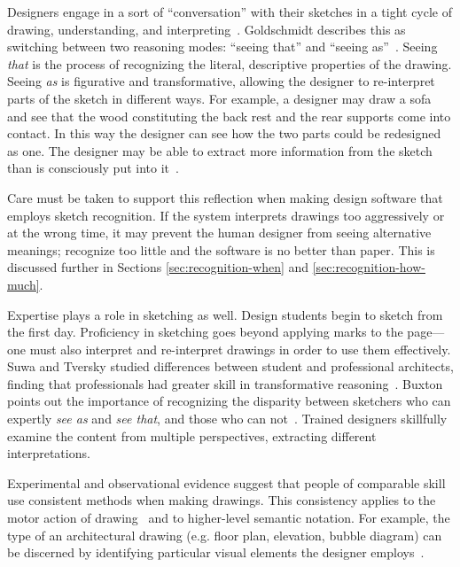 Designers engage in a sort of ``conversation'' with their sketches in
a tight cycle of drawing, understanding, and
interpreting~\cite{schon-kinds-of-seeing}. Goldschmidt describes this
as switching between two reasoning modes: ``seeing that'' and ``seeing
as''~\cite{goldschmidt-dialectics}. Seeing \textit{that} is the
process of recognizing the literal, descriptive properties of the
drawing.  Seeing \textit{as} is figurative and transformative,
allowing the designer to re-interpret parts of the sketch in different
ways. For example, a designer may draw a sofa and see that the wood
constituting the back rest and the rear supports come into contact. In
this way the designer can see how the two parts could be redesigned as
one. The designer may be able to extract more information from the
sketch than is consciously put into it~\cite{goldschmidt-backtalk}.

Care must be taken to support this reflection when making design
software that employs sketch recognition. If the system interprets
drawings too aggressively or at the wrong time, it may prevent the
human designer from seeing alternative meanings; recognize too little
and the software is no better than paper. This is discussed further in
Sections \ref{sec:recognition-when}
and \ref{sec:recognition-how-much}.

Expertise plays a role in sketching as well. Design students begin to
sketch from the first day. Proficiency in sketching goes beyond
applying marks to the page---one must also interpret and re-interpret
drawings in order to use them effectively. Suwa and Tversky studied
differences between student and professional architects, finding that
professionals had greater skill in transformative
reasoning~\cite{suwa-analysis-students}. Buxton points out the
importance of recognizing the disparity between sketchers who can
expertly \textit{see as} and \textit{see that}, and those who can
not~\cite[page 118]{buxton-sketching}. Trained designers skillfully
examine the content from multiple perspectives, extracting different
interpretations.

Experimental and observational evidence suggest that people of
comparable skill use consistent methods when making drawings. This
consistency applies to the motor action of
drawing~\cite{van-sommers-cognition} and to higher-level semantic
notation. For example, the type of an architectural drawing
(e.g. floor plan, elevation, bubble diagram) can be discerned by
identifying particular visual elements the designer
employs~\cite{neiman-sketch-retrospective,do-design-sketches-tools}.

